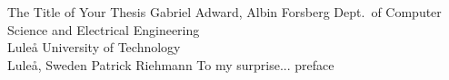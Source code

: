\documentclass[12pt,a4paper, twoside]{JU-template}
\begin{document}
\def\thesistitle{The Title of Your Thesis}
\def\theauthor{Gabriel Adward, Albin Forsberg}
\def\theaddress{Dept.\ of Computer Science and Electrical Engineering\\
Lule{\aa} University of Technology\\ Lule{\aa}, Sweden}

\def\supervisors{Patrick Riehmann}
\def\supervisorstring{Supervisor:} %
\def\dedication{To my surprise...}

\def\theabstract{}
\def\thepreface{preface}



\def\thelogo{} %


\startpreamble
  {\thesistitle}
  {\theauthor}
  {\theaddress}
  {\supervisors}
  {\dedication}
  {\theabstract}
  {\thepreface}
  {\thelogo}

\begin{bibunit}







\makebib

\end{bibunit}
\end{document}
